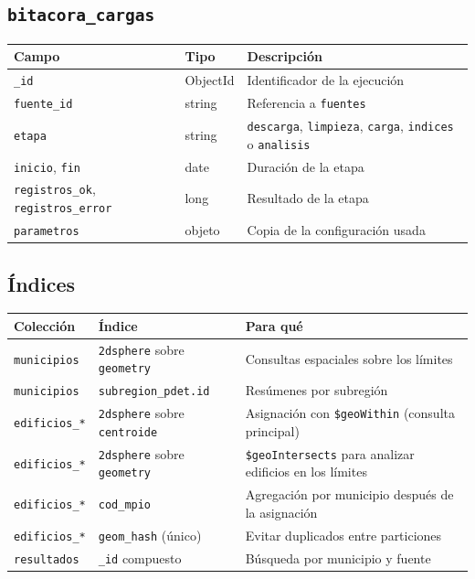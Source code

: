 \documentclass[11pt,a4paper]{article}
\newcommand{\campo}[1]{\texttt{#1}}
\begin{document}
\subsection{\texorpdfstring{\campo{bitacora\_cargas}}{bitacora\_cargas}}

\begin{table}[H]
\centering\small
\begin{tabularx}{\textwidth}{@{}p{4.4cm}p{2.4cm}L@{}}
\toprule
\textbf{Campo} & \textbf{Tipo} & \textbf{Descripción} \\
\midrule
\campo{\_id} & ObjectId & Identificador de la ejecución \\
\campo{fuente\_id} & string & Referencia a \campo{fuentes} \\
\campo{etapa} & string & \campo{descarga}, \campo{limpieza}, \campo{carga}, \campo{indices} o \campo{analisis} \\
\campo{inicio}, \campo{fin} & date & Duración de la etapa \\
\campo{registros\_ok}, \campo{registros\_error} & long & Resultado de la etapa \\
\campo{parametros} & objeto & Copia de la configuración usada \\
\bottomrule
\end{tabularx}
\end{table}

\subsection{Índices}\begin{table}[H]
\centering\small
\begin{tabularx}{\textwidth}{@{}p{3.4cm}p{4.6cm}L@{}}
\toprule
\textbf{Colección} & \textbf{Índice} & \textbf{Para qué} \\
\midrule
\campo{municipios} & \campo{2dsphere} sobre \campo{geometry} & Consultas espaciales sobre los límites \\
\campo{municipios} & \campo{subregion\_pdet.id} & Resúmenes por subregión \\
\campo{edificios\_*} & \campo{2dsphere} sobre \campo{centroide} & Asignación con \campo{\$geoWithin} (consulta principal) \\
\campo{edificios\_*} & \campo{2dsphere} sobre \campo{geometry} & \campo{\$geoIntersects} para analizar edificios en los límites \\
\campo{edificios\_*} & \campo{cod\_mpio} & Agregación por municipio después de la asignación \\
\campo{edificios\_*} & \campo{geom\_hash} (único) & Evitar duplicados entre particiones \\
\campo{resultados} & \campo{\_id} compuesto & Búsqueda por municipio y fuente \\
\bottomrule
\end{tabularx}
\end{table}
\end{document}
